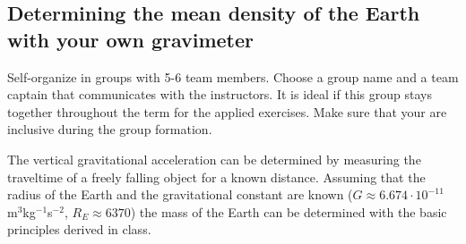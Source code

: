 \subsection{Determining the mean density of the Earth with your own gravimeter}
\begin{tcolorbox}[enhanced jigsaw,breakable,pad at break*=1mm,
    colback=blue!5!white,colframe=burgundy,title=Group Work,
    watermark color=white]
    Self-organize in groups with 5-6 team members. Choose a group name and a team captain that communicates with the instructors. It is ideal if this group stays together throughout the term for the applied exercises. Make sure that your are inclusive during the group formation.
\end{tcolorbox}

  The vertical gravitational acceleration can be determined by measuring the traveltime of a freely falling object for a known distance. Assuming that the radius of the Earth and the gravitational constant are known ($G\approx6.674\cdot10^{-11}$ m$^{3}$kg$^{-1}$s$^{-2}$, $R_E \approx 6370 $) the mass of the Earth can be determined with the basic principles derived in class.

